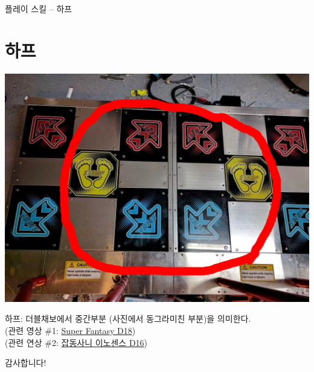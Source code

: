 \documentclass{beamer}
\begin{document}
\begin{frame}{플레이 스킬 -- 하프}
	\section{하프}
	\begin{center}
		\includegraphics[scale=0.135]{piu-half.jpg}
	\end{center}

	하프: 더블채보에서 중간부분 (사진에서 동그라미친 부분)을 의미한다. \\
	(관련 영상 \#1: \href{https://www.youtube.com/watch?v=emOEtjVNjqw}{Super Fantasy D18}) \\
	(관련 연상 \#2: \href{https://www.youtube.com/watch?v=gdDAkSXkn9k}{잡동사니 이노센스 D16})
\end{frame}

\begin{frame}
	\begin{center}
		감사합니다!
	\end{center}
\end{frame}
\end{document}
